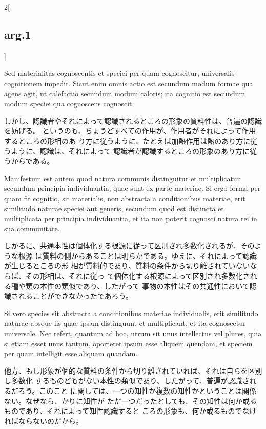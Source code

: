 \documentclass[paper=a4paper,fontsize=10pt,jafontsize=9pt,titlepage]{jlreq}
\begin{document}
\begin{paracol}{2}[\subsection{arg.1}]
\switchcolumn*


 Sed materialitas cognoscentis et speciei per quam cognoscitur, universalis
 cognitionem impedit. Sicut enim omnis actio est secundum modum formae qua agens
 agit, ut calefactio secundum modum caloris; ita cognitio est secundum modum
 speciei qua cognoscens cognoscit.

\switchcolumn

しかし、認識者やそれによって認識されるところの形象の質料性は、普遍の認識を妨げる。
というのも、ちょうどすべての作用が、作用者がそれによって作用するところの形相のあ
り方に従うように、たとえば加熱作用は熱のあり方に従うように、認識は、それによって
認識者が認識するところの形象のあり方に従うからである。
 
\switchcolumn*

 Manifestum est autem quod natura communis distinguitur et multiplicatur
 secundum principia individuantia, quae sunt ex parte materiae. Si ergo forma
 per quam fit cognitio, sit materialis, non abstracta a conditionibus materiae,
 erit similitudo naturae speciei aut generis, secundum quod est distincta et
 multiplicata per principia individuantia, et ita non poterit cognosci natura
 rei in sua communitate.

\switchcolumn

しかるに、共通本性は個体化する根源に従って区別され多数化されるが、そのような根源
は質料の側からあることは明らかである。ゆえに、それによって認識が生じるところの形
相が質料的であり、質料の条件から切り離されていないならば、その形相は、それに従っ
て個体化する根源によって区別され多数化される種や類の本性の類似であり、したがって
事物の本性はその共通性において認識されることができなかったであろう。
 
\switchcolumn*


 Si vero species sit abstracta a conditionibus materiae individualis, erit
 similitudo naturae absque iis quae ipsam distinguunt et multiplicant, et ita
 cognoscetur universale. Nec refert, quantum ad hoc, utrum sit unus intellectus
 vel plures, quia si etiam esset unus tantum, oporteret ipsum esse aliquem
 quendam, et speciem per quam intelligit esse aliquam quandam.

\switchcolumn

他方、もし形象が個的な質料の条件から切り離されていれば、それは自らを区別し多数化
するものどもがない本性の類似であり、したがって、普遍が認識されるだろう。このこと
に関しては、一つの知性か複数の知性かということは関係ない。なぜなら、かりに知性が
ただ一つだったとしても、その知性は何か或るものであり、それによって知性認識すると
ころの形象も、何か或るものでなければならないのだから。
 

\end{paracol}
\end{document}
